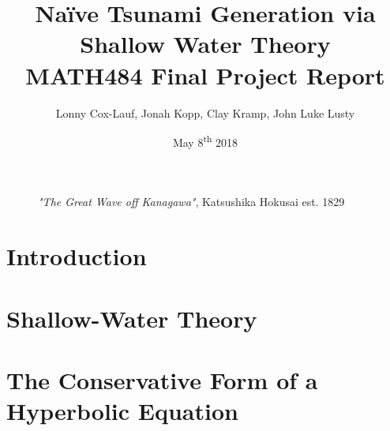 \documentclass[12pt,a4]{article}
\begin{document}
\title{Na\"ive Tsunami Generation via Shallow Water Theory\\
\large  MATH484 Final Project Report}
\author{Lonny Cox-Lauf, Jonah Kopp, Clay Kramp, John Luke Lusty}
\date{May 8\textsuperscript{th} 2018}

\begin{titlepage}
	\maketitle
    \begin{figure}[h]
        \centering
        \caption*{\textit{"The Great Wave off Kanagawa"}, Katsushika Hokusai est. 1829}
    \end{figure}
\end{titlepage}
	
\tableofcontents
\pagebreak

\section{Introduction}


\section{Shallow-Water Theory}


\section{The Conservative Form of a Hyperbolic Equation}

\end{document}
